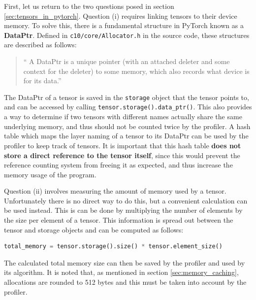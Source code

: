 \documentclass[12pt,letterpaper]{article}
\begin{document}
First, let us return to the two questions posed in section \ref{sec:tensors_in_pytorch}. Question (i) requires linking tensors to their device memory. To solve this, there is a fundamental structure in PyTorch known as a \textbf{DataPtr}. Defined in \texttt{c10/core/Allocator.h} in the source code, these structures are described as follows:
\begin{quote}
\enquote{
A DataPtr is a unique pointer (with an attached deleter and some context for the deleter) to some memory, which also records what device is for its data.}
\end{quote}
The DataPtr of a tensor is saved in the \texttt{storage} object that the tensor points to, and can be accessed by calling \texttt{tensor.storage().data\_ptr()}. This also provides a way to determine if two tensors with different names actually share the same underlying memory, and thus should not be counted twice by the profiler. A hash table which maps the layer naming of a tensor to its DataPtr can be used by the profiler to keep track of tensors. It is important that this hash table \textbf{does not store a direct reference to the tensor itself}, since this would prevent the reference counting system from freeing it as expected, and thus increase the memory usage of the program. 
\par 

Question (ii) involves measuring the amount of memory used by a tensor. Unfortunately there is no direct way to do this, but a convenient calculation can be used instead. This is can be done by multiplying the number of elements by the size per element of a tensor. This information is spread out between the tensor and storage objects and can be computed as follows:
\begin{lstlisting}[language=Python]
total_memory = tensor.storage().size() * tensor.element_size()
\end{lstlisting}
The calculated total memory size can then be saved by the profiler and used by its algorithm. It is noted that, as mentioned in section \ref{sec:memory_caching}, allocations are rounded to 512 bytes and this must be taken into account by the profiler.
\par 
\end{document}
